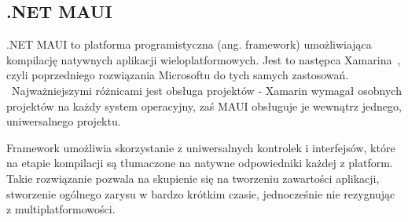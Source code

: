 \subsection{.NET MAUI}
.NET MAUI \cite{mauiDefinition} to platforma programistyczna (ang. framework) umożliwiająca
kompilację natywnych aplikacji wieloplatformowych. Jest to następca Xamarina~\cite{xamarin},
czyli poprzedniego rozwiązania Microsoftu do tych samych zastosowań. \\\
Najważniejszymi różnicami jest obsługa projektów - Xamarin wymagał osobnych projektów na każdy system operacyjny, 
zaś MAUI obsługuje je wewnątrz jednego, uniwersalnego projektu.

Framework umożliwia skorzystanie z uniwersalnych kontrolek i interfejsów, 
które na etapie kompilacji są tłumaczone na natywne odpowiedniki każdej z platform. 
Takie rozwiązanie pozwala na skupienie się na tworzeniu zawartości aplikacji,
stworzenie ogólnego zarysu w bardzo krótkim czasie, jednocześnie nie rezygnując z multiplatformowości.
